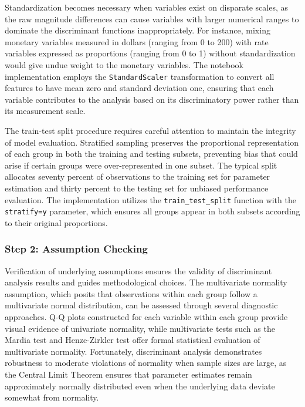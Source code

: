 \documentclass[
]{article}
\begin{document}
Standardization becomes necessary when variables exist on disparate
scales, as the raw magnitude differences can cause variables with larger
numerical ranges to dominate the discriminant functions inappropriately.
For instance, mixing monetary variables measured in dollars (ranging
from 0 to 200) with rate variables expressed as proportions (ranging
from 0 to 1) without standardization would give undue weight to the
monetary variables. The notebook implementation employs the
\texttt{StandardScaler} transformation to convert all features to have
mean zero and standard deviation one, ensuring that each variable
contributes to the analysis based on its discriminatory power rather
than its measurement scale.

The train-test split procedure requires careful attention to maintain
the integrity of model evaluation. Stratified sampling preserves the
proportional representation of each group in both the training and
testing subsets, preventing bias that could arise if certain groups were
over-represented in one subset. The typical split allocates seventy
percent of observations to the training set for parameter estimation and
thirty percent to the testing set for unbiased performance evaluation.
The implementation utilizes the \texttt{train\_test\_split} function
with the \texttt{stratify=y} parameter, which ensures all groups appear
in both subsets according to their original proportions.

\subsubsection{Step 2: Assumption Checking}

Verification of underlying assumptions ensures the validity of
discriminant analysis results and guides methodological choices. The
multivariate normality assumption, which posits that observations within
each group follow a multivariate normal distribution, can be assessed
through several diagnostic approaches. Q-Q plots constructed for each
variable within each group provide visual evidence of univariate
normality, while multivariate tests such as the Mardia test and
Henze-Zirkler test offer formal statistical evaluation of multivariate
normality. Fortunately, discriminant analysis demonstrates robustness to
moderate violations of normality when sample sizes are large, as the
Central Limit Theorem ensures that parameter estimates remain
approximately normally distributed even when the underlying data deviate
somewhat from normality.
\end{document}
